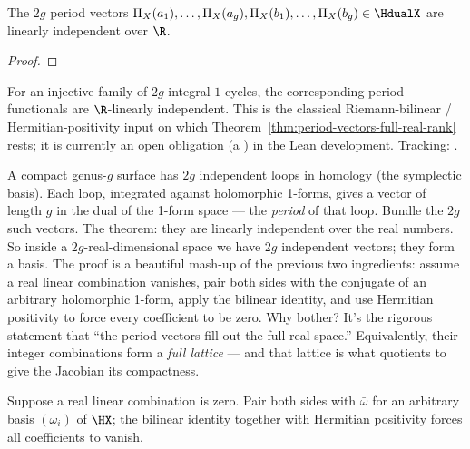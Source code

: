 \begin{theorem}
\label{thm:period-vectors-full-real-rank}
The \(2g\) period vectors
\(\Pi_X(a_1),\dots,\Pi_X(a_g),\Pi_X(b_1),\dots,\Pi_X(b_g)
   \in\HdualX\)
are linearly independent over \(\R\).
\leanok
\end{theorem}
\begin{proof}\leanok\end{proof}

\begin{lemma}
\label{lem:riemann-classical-real-li-input}
For an injective family of \(2g\) integral \(1\)-cycles, the corresponding
period functionals are \(\R\)-linearly independent. This is the classical
Riemann-bilinear / Hermitian-positivity input on which
Theorem~\ref{thm:period-vectors-full-real-rank} rests; it is currently an open
obligation (a ) in the Lean development.
Tracking: .
\end{lemma}

\begin{layman}
A compact genus-\(g\) surface has \(2g\) independent loops in homology
(the symplectic basis). Each loop, integrated against holomorphic
1-forms, gives a vector of length \(g\) in the dual of the 1-form
space --- the \emph{period} of that loop. Bundle the \(2g\) such
vectors. The theorem: they are linearly independent over the real
numbers. So inside a \(2g\)-real-dimensional space we have \(2g\)
independent vectors; they form a basis. The proof is a beautiful
mash-up of the previous two ingredients: assume a real linear
combination vanishes, pair both sides with the conjugate of an arbitrary
holomorphic 1-form, apply the bilinear identity, and use Hermitian
positivity to force every coefficient to be zero. Why bother? It's the
rigorous statement that ``the period vectors fill out the full real
space.'' Equivalently, their integer combinations form a \emph{full
lattice} --- and that lattice is what quotients to give the Jacobian its
compactness.
\end{layman}

\begin{proofsketch}
Suppose a real linear combination is zero. Pair both sides with
\(\bar\omega\) for an arbitrary basis \((\omega_i)\) of \(\HX\); the
bilinear identity together with Hermitian positivity forces all
coefficients to vanish.
\end{proofsketch}

